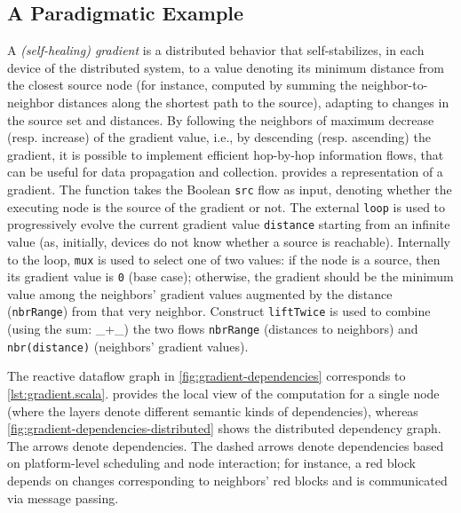 \documentclass[12pt,a4paper,openright,twoside]{book}
\begin{document}
\subsection{A Paradigmatic Example}

A \textit{(self-healing) gradient} is a distributed behavior that self-stabilizes, in each device of the distributed system, to a value denoting its minimum distance from the closest source node (for instance, computed by summing the neighbor-to-neighbor distances along the shortest path to the source), adapting to changes in the source set and distances. By following the neighbors of maximum decrease (resp. increase) of the gradient value, i.e., by descending (resp. ascending) the gradient, it is possible to implement efficient hop-by-hop information flows, that can be useful for data propagation and collection.  provides a representation of a gradient. The function takes the Boolean \texttt{src} flow as input, denoting whether the executing node is the source of the gradient or not. The external \texttt{loop} is used to progressively evolve the current gradient value \texttt{distance} starting from an infinite value (as, initially, devices do not know whether a source is reachable). Internally to the loop, \texttt{mux} is used to select one of two values: if the node is a source, then its gradient value is \texttt{0} (base case); otherwise, the gradient should be the minimum value among the neighbors' gradient values augmented by the distance (\texttt{nbrRange}) from that very neighbor. Construct \texttt{liftTwice} is used to combine (using the sum: \_+\_) the two flows \texttt{nbrRange} (distances to neighbors) and \texttt{nbr(distance)} (neighbors' gradient values).



The reactive dataflow graph in \cref{fig:gradient-dependencies} corresponds to \cref{lst:gradient.scala}.  provides the local view of the computation for a single node (where the layers denote different semantic kinds of dependencies), whereas \cref{fig:gradient-dependencies-distributed} shows the distributed dependency graph. The arrows denote dependencies. The dashed arrows denote dependencies based on platform-level scheduling and node interaction; for instance, a red block depends on changes corresponding to neighbors' red blocks and is communicated via message passing.
\end{document}
